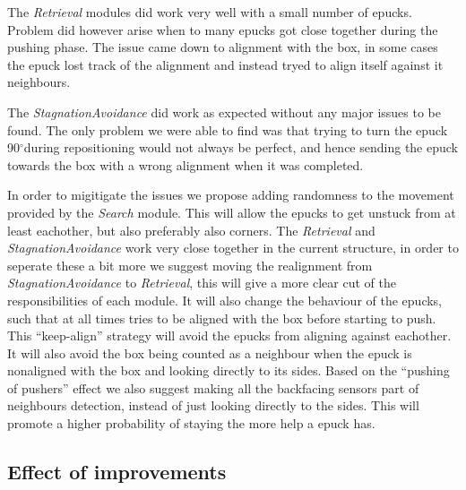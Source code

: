 \documentclass[12pt]{article}
\newcommand{\shiftline}[0]{\hfill\newline\noindent}
\newcommand{\degree}[0]{\ensuremath{^\circ}}
\begin{document}
			\shiftline The \textit{Retrieval} modules did work very well with a small number of epucks. Problem did however arise when to many epucks got close together during
			the pushing phase. The issue came down to alignment with the box, in some cases the epuck lost track of the alignment and instead tryed to align itself against it neighbours. 
			
			\shiftline The \textit{StagnationAvoidance} did work as expected without any major issues to be found. The only problem we were able to find was that trying to turn the
			epuck 90\degree during repositioning would not always be perfect, and hence sending the epuck towards the box with a wrong alignment when it was completed. 
			
			\shiftline In order to migitigate the issues we propose adding randomness to the movement provided by the \textit{Search} module. This will allow the epucks to get 
			unstuck from at least eachother, but also preferably also corners. The \textit{Retrieval} and \textit{StagnationAvoidance} work very close together in the current
			structure, in order to seperate these a bit more we suggest moving the realignment from \textit{StagnationAvoidance} to \textit{Retrieval}, this will give a more 
			clear cut of the responsibilities of each module. It will also change the behaviour of the epucks, such that at all times tries to be aligned with the box
			before starting to push. This "`keep-align"' strategy will avoid the epucks from aligning against eachother. It will also avoid the box being counted as a 
			neighbour when the epuck is nonaligned with the box and looking directly to its sides.
			Based on the "`pushing of pushers"' effect we also suggest making all the backfacing sensors part of neighbours detection, instead of just looking directly
			to the sides. This will promote a higher probability of staying the more help a epuck has.
		
	\subsection{Effect of improvements}
		
\end{document}
